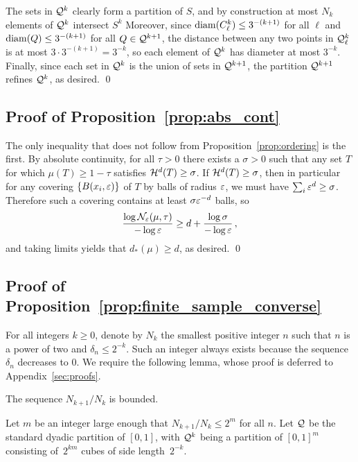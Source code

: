 The sets in $\mathcal{Q}^k$ clearly form a partition of $S$, and by construction at most $N_k$ elements of $\mathcal{Q}^k$ intersect $S^k$
Moreover, since $\operatorname{diam}(C^k_\ell) \leq 3^{-(k+1)}$ for all $\ell$ and $\operatorname{diam}(Q) \leq 3^{-(k+1)}$ for all $Q \in \mathcal{Q}^{k+1}$, the distance between any two points in $\mathcal{Q}^k_\ell$ is at most $3 \cdot 3^{-(k+1)} = 3^{-k}$, so each element of $\mathcal{Q}^k$ has diameter at most $3^{-k}$.
Finally, since each set in $\mathcal{Q}^k$ is the union of sets in $\mathcal{Q}^{k+1}$, the partition $\mathcal{Q}^{k+1}$ refines $\mathcal{Q}^k$, as desired.
\qed

\subsection{Proof of Proposition~\ref{prop:abs_cont}}
The only inequality that does not follow from Proposition~\ref{prop:ordering} is the first.
By absolute continuity, for all $\tau > 0$ there exists a $\sigma > 0$ such that any set $T$ for which $\mu(T) \geq 1- \tau$ satisfies $\mathcal{H}^d(T) \geq \sigma$.
If $\mathcal{H}^d(T) \geq \sigma$, then in particular for any covering $\{B(x_i, \varepsilon)\}$ of $T$ by balls of radius $\varepsilon$, we must have $\sum_{i} \varepsilon^d \geq \sigma$.
Therefore such a covering contains at least $\sigma \varepsilon^{-d}$ balls, so
\begin{equation*}
\frac{\log \mathcal{N}_\varepsilon(\mu, \tau)}{- \log \varepsilon} \geq d + \frac{\log \sigma}{- \log \varepsilon}\,,
\end{equation*}
and taking limits yields that $d_*(\mu) \geq d$, as desired.
\qed



\subsection{Proof of Proposition~\ref{prop:finite_sample_converse}}
For all integers $k \geq 0$, denote by $N_k$ the smallest positive integer $n$ such that $n$ is a power of two and $\delta_{n} \leq 2^{-k}$.
Such an integer always exists because the sequence $\delta_n$ decreases to $0$.
We require the following lemma, whose proof is deferred to Appendix~\ref{sec:proofs}.
\begin{applemma}\label{lem:converse_m_bound}
The sequence $N_{k+1}/N_k$ is bounded.
\end{applemma}
Let $m$ be an integer large enough that $N_{k+1}/N_k \leq 2^m$ for all $n$.
Let $\mathcal{Q}$ be the standard dyadic partition of $[0, 1]$, with $\mathcal{Q}^k$ being a partition of $[0, 1]^m$ consisting of~$2^{km}$ cubes of side length~$2^{-k}$.

